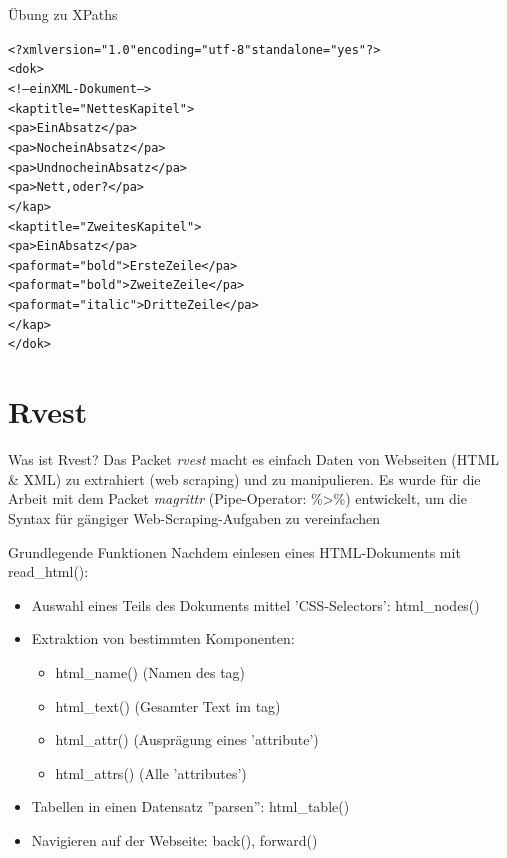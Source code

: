 \documentclass[xcolor=dvipsnames]{beamer}\usepackage[]{graphicx}\usepackage[]{color}
\makeatletter
\newcommand{\hlstr}[1]{\textcolor[rgb]{0.192,0.494,0.8}{#1}}%
\newenvironment{kframe}{%
 \def\at@end@of@kframe{}%
 \ifinner\ifhmode%
  \def\at@end@of@kframe{\end{minipage}}%
  \begin{minipage}{\columnwidth}%
 \fi\fi%
 \def\FrameCommand##1{\hskip\@totalleftmargin \hskip-\fboxsep
 \colorbox{shadecolor}{##1}\hskip-\fboxsep
     \hskip-\linewidth \hskip-\@totalleftmargin \hskip\columnwidth}%
 \MakeFramed {\advance\hsize-\width
   \@totalleftmargin\z@ \linewidth\hsize
   \@setminipage}}%
 {\par\unskip\endMakeFramed%
 \at@end@of@kframe}
\makeatother
\begin{document}
\begin{frame}[fragile]{Übung zu XPaths}
\begin{kframe}
\begin{alltt}
<?xml version=\hlstr{"1.0"} encoding=\hlstr{"utf-8"} standalone=\hlstr{"yes"} ?>
<dok>
    <!-- ein XML-Dokument -->
    <kap title=\hlstr{"Nettes Kapitel"}>
        <pa>Ein Absatz</pa>
        <pa>Noch ein Absatz</pa>
        <pa>Und noch ein Absatz</pa>
        <pa>Nett, oder?</pa>
    </kap>
    <kap title=\hlstr{"Zweites Kapitel"}>
        <pa>Ein Absatz</pa>
        <pa format=\hlstr{"bold"}>Erste Zeile</pa>
        <pa format=\hlstr{"bold"}>Zweite Zeile</pa>
        <pa format=\hlstr{"italic"}>Dritte Zeile</pa>
    </kap>
</dok>
\end{alltt}
\end{kframe}
\end{frame}



\section{Rvest} %


\begin{frame}{Was ist Rvest?}
Das Packet \textit{rvest} macht es einfach Daten von Webseiten (HTML \& XML) zu extrahiert (web scraping) und zu manipulieren. Es wurde für die Arbeit mit dem Packet \textit{magrittr} (Pipe-Operator: \%>\%) entwickelt, um die Syntax für gängiger Web-Scraping-Aufgaben zu vereinfachen
\end{frame}


\begin{frame}{Grundlegende Funktionen}
Nachdem einlesen eines HTML-Dokuments mit read\_html():
  \begin{itemize}
  \item Auswahl eines Teils des Dokuments mittel 'CSS-Selectors': html\_nodes() 
  \item Extraktion von bestimmten Komponenten:
    \begin{itemize}
      \item html\_name() (Namen des tag)
      \item html\_text() (Gesamter Text im tag)
      \item html\_attr() (Ausprägung eines 'attribute')
      \item html\_attrs() (Alle 'attributes')
    \end{itemize}
  \item Tabellen in einen Datensatz ''parsen'': html\_table()
  \item Navigieren auf der Webseite: back(), forward()
  \end{itemize}
\end{frame}
\end{document}
